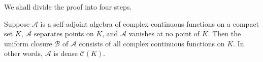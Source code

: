 We shall divide the proof into four steps.



\begin{thm}
    \label{thm:7.33}
    Suppose $\mathscr{A}$ is a self-adjoint algebra of complex continuous functions on a compact set $K$, 
    $\mathscr{A}$ separates points on $K$, 
    and $\mathscr{A}$ vanishes at no point of $K$. 
    Then the uniform closure $\mathscr{B}$ of $\mathscr{A}$ consists of all complex continuous functions on $K$. 
    In other words, $\mathscr{A}$ is dense $\mathscr{C}(K)$.
\end{thm}



